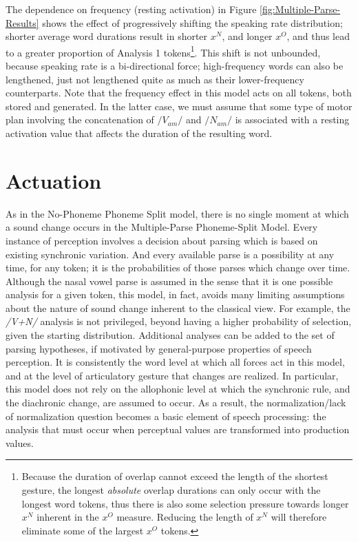 The dependence on frequency (resting activation) in Figure \ref{fig:Multiple-Parse-Results}
shows the effect of progressively shifting the speaking rate distribution;
shorter average word durations result in shorter $x^{N}$, and longer
$x^{O}$, and thus lead to a greater proportion of Analysis 1 tokens\footnote{Because the duration of overlap cannot exceed the length of the shortest
gesture, the longest \emph{absolute} overlap durations can only occur
with the longest word tokens, thus there is also some selection pressure
towards longer $x^{N}$ inherent in the $x^{O}$ measure. Reducing
the length of $x^{N}$ will therefore eliminate some of the largest
$x^{O}$ tokens.}. This shift is not unbounded, because speaking rate is a bi-directional
force; high-frequency words can also be lengthened, just not lengthened
quite as much as their lower-frequency counterparts. Note that the
frequency effect in this model acts on all tokens, both stored and
generated. In the latter case, we must assume that some type of motor
plan involving the concatenation of $/V_{am}/$ and $/N_{am}/$ is
associated with a resting activation value that affects the duration
of the resulting word. 

\section{Actuation }

As in the No-Phoneme Phoneme Split model, there is no single moment
at which a sound change occurs in the Multiple-Parse Phoneme-Split
Model. Every instance of perception involves a decision about parsing
which is based on existing synchronic variation. And every available
parse is a possibility at any time, for any token; it is the probabilities
of those parses which change over time. Although the nasal vowel parse
is assumed in the sense that it is one possible analysis for a given
token, this model, in fact, avoids many limiting assumptions about
the nature of sound change inherent to the classical view. For example,
the \emph{/V+N/} analysis is not privileged, beyond having a higher
probability of selection, given the starting distribution. Additional
analyses can be added to the set of parsing hypotheses, if motivated
by general-purpose properties of speech perception. It is consistently
the word level at which all forces act in this model, and at the level
of articulatory gesture that changes are realized. In particular,
this model does not rely on the allophonic level at which the synchronic
rule, and the diachronic change, are assumed to occur. As a result,
the normalization/lack of normalization question becomes a basic element
of speech processing: the analysis that must occur when perceptual
values are transformed into production values. 

